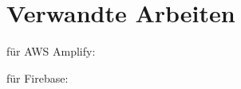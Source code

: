 \chapter{Verwandte Arbeiten}

für AWS Amplify:
\autocite{st2021handy}
\autocite{kuwamura2021application}
\autocite{naraharisetty2021cloud}

für Firebase:
\autocite{rahman2021project}
\autocite{khawas2018application}
\autocite{rahmi2017findoctor}
\autocite{li2018justiot}
\autocite{sharma2019firebase}
\autocite{bhadoria2020chatapp}